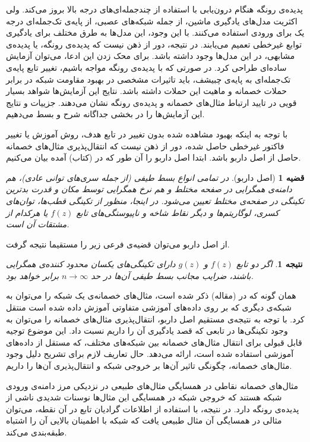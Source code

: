 \documentclass[12pt,onecolumn,a4paper]{article}
\newtheorem{theorem}{قضیه}[section]
\newtheorem{corollary}{نتیجه‌}[theorem]
\begin{document}
پدیده‌ی رونگه هنگام درون‌یابی با استفاده از چندجمله‌ای‌های درجه بالا بروز می‌کند. ولی اکثریت مدل‌های یادگیری ماشین، از جمله شبکه‌های عصبی، از پایه‌ی تک‌جمله‌ای درجه یک برای ورودی استفاده می‌کنند. با این وجود، این مدل‌ها به طرق مختلف برای یادگیری توابع غیرخطی تعمیم می‌یابند. در نتیجه، دور از ذهن نیست که پدیده‌ی رونگه، یا پدیده‌ی مشابهی، در این مدل‌ها وجود داشته باشد. برای محک زدن این ادعا، می‌توان آزمایش ساده‌ای طراحی کرد. در صورتی که با پدیده‌ی رونگه مواجه باشیم، تغییر تابع پایه‌ی تک‌جمله‌ای به پایه‌ی چبیشف، باید تاثیرات مشخصی در بهبود مقاومت شبکه در برابر حملات خصمانه و ماهیت این حملات داشته باشد. نتایج این آزمایش‌ها شواهد بسیار قویی در تایید ارتباط مثال‌های خصمانه و پدیده‌ی رونگه نشان می‌دهند. جزییات و نتایج این آزمایش‌ها را در بخشی جداگانه شرح و بسط می‌دهیم.

با توجه به اینکه بهبود مشاهده شده بدون تغییر در تابع هدف، روش آموزش یا تغییر فاکتور غیرخطی حاصل شده، دور از ذهن نیست که انتقال‌پذیری مثال‌های خصمانه حاصل از اصل داربو باشد. ابتدا اصل داربو را آن طور که در (کتاب) آمده بیان می‌کنیم.
\begin{theorem}[اصل داربو]
    در تمامی انواع بسط طیفی (از جمله سری‌های توانی عادی)، هم دامنه‌ی همگرایی در صفحه مختلط و هم نرخ همگرایی توسط مکان و قدرت بدترین تکینگی در صفحه‌ی مختلط تعیین می‌شود. در اینجا، منظور از تکینگی قطب‌ها، توان‌های کسری، لوگاریتم‌ها و دیگر نقاط شاخه و ناپیوستگی‌های تابع 
    $f(z)$ 
    یا هرکدام از مشتقات آن است.
\end{theorem}

از اصل داربو می‌توان قضیه‌ی فرعی زیر را مستقیما نتیجه گرفت.

\begin{corollary}
    اگر دو تابع 
    $f(z)$ 
    و 
    $g(z)$ 
    دارای تکینگی‌های یکسان محدود کننده‌ی همگرایی باشند، ضرایب مجانب بسط طیفی آن‌ها در حد
    $n \rightarrow \infty$ 
    برابر خواهد بود.
\end{corollary}

همان گونه که در (مقاله) ذکر شده است، مثال‌های خصمانه‌ی یک شبکه را می‌توان به شبکه‌ی دیگری که بر روی داده‌های آموزشی متفاوتی آموزش داده شده است منتقل کرد. با توجه به نتیجه‌ی مستقیم اصل داربو، انتقال‌پذیری مثال‌های خصمانه را می‌توان به وجود تکینگی‌ها در تابعی که قصد یادگیری آن را داریم نسبت داد. این موضوع توجیه قابل قبولی برای انتقال مثال‌های خصمانه بین شبکه‌های مختلف، که مستقل از داده‌های آموزشی استفاده شده است، ارائه می‌دهد. حال تعاریف لازم برای تشریح دلیل وجود مثال‌های خصمانه، چگونگی تاثیر آن‌ها بر خروجی شبکه و انتقال‌پذیری آن‌ها را داریم.

مثال‌های خصمانه نقاطی در همسایگی مثال‌های طبیعی در نزدیکی مرز دامنه‌ی ورودی شبکه هستند که خروجی شبکه در همسایگی این مثال‌ها نوسنات شدیدی ناشی از پدیده‌ی رونگه دارد. در نتیجه، با استفاده از اطلاعات گرادیان تابع در آن نقطه، می‌توان مثالی در همسایگی آن مثال طبیعی یافت که شبکه با اطمینان بالایی آن را اشتباه طبقه‌بندی می‌کند.
\end{document}
